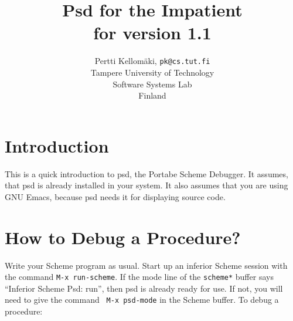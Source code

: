 %
%

%
%
%
%
%
%
%
%
%
%
%



\newcommand{\scheme}[1]{{\tt #1}}

\author{Pertti Kellom\"aki, {\tt pk@cs.tut.fi}\\ 
\small Tampere University of Technology \\
\small Software Systems Lab \\
\small Finland}
\title{Psd for the Impatient \\ \small for version 1.1}
\maketitle

\section{Introduction}
\label{sec:intro}

This is a quick introduction to psd, the Portabe Scheme Debugger.  It
assumes, that psd is already installed in your system. It also assumes
that you are using GNU Emacs, because psd needs it for displaying
source code.

\section{How to Debug a Procedure?}

Write your Scheme program as usual.  Start up an inferior Scheme
session with the command {\tt M-x run-scheme}. If the mode line of the
{\tt *scheme*} buffer says ``Inferior Scheme Psd: run'', then psd is
already ready for use. If not, you will need to give the command {\tt
M-x psd-mode} in the Scheme buffer.  To debug a procedure:

